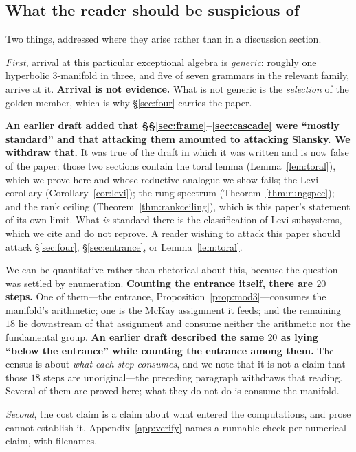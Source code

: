 \documentclass[11pt,reqno]{amsart}
\theoremstyle{plain}
\theoremstyle{definition}
\theoremstyle{remark}
\begin{document}
\subsection{What the reader should be suspicious of}\label{sec:suspicious}
Two things, addressed where they arise rather than in a discussion section.

\emph{First}, arrival at this particular exceptional algebra is \emph{generic}: roughly
one hyperbolic $3$-manifold in three, and five of seven grammars in the relevant
family, arrive at it. \textbf{Arrival is not evidence.} What is not generic is the
\emph{selection} of the golden member, which is why \S\ref{sec:four} carries the paper.

\textbf{An earlier draft added that \S\S\ref{sec:frame}--\ref{sec:cascade} were ``mostly
standard'' and that attacking them amounted to attacking Slansky. We withdraw that.} It
was true of the draft in which it was written and is now false of the paper: those two
sections contain the toral lemma (Lemma~\ref{lem:toral}), which we prove here and whose
reductive analogue we show fails; the Levi corollary (Corollary~\ref{cor:levi}); the rung
spectrum (Theorem~\ref{thm:rungspec}); and the rank ceiling
(Theorem~\ref{thm:rankceiling}), which is this paper's statement of its own limit. What
\emph{is} standard there is the classification of Levi subsystems, which we cite and do
not reprove. A reader wishing to attack this paper should attack \S\ref{sec:four},
\S\ref{sec:entrance}, or Lemma~\ref{lem:toral}.

We can be quantitative rather than rhetorical about this, because the question was
settled by enumeration. \textbf{Counting the entrance itself, there are $20$ steps.} One
of them---the entrance, Proposition~\ref{prop:mod3}---consumes the manifold's arithmetic;
one is the McKay assignment it feeds; and the remaining $18$ lie downstream of that
assignment and consume neither the arithmetic nor the fundamental group. \textbf{An
earlier draft described the same $20$ as lying ``below the entrance'' while counting the
entrance among them.} The census is about \emph{what each step consumes}, and we note
that it is not a claim that those $18$ steps are unoriginal---the preceding paragraph
withdraws that reading. Several of them are proved here; what they do not do is consume
the manifold.

\emph{Second}, the cost claim is a claim about what entered the computations, and prose
cannot establish it. Appendix~\ref{app:verify} names a runnable check per numerical
claim, with filenames.
\end{document}
